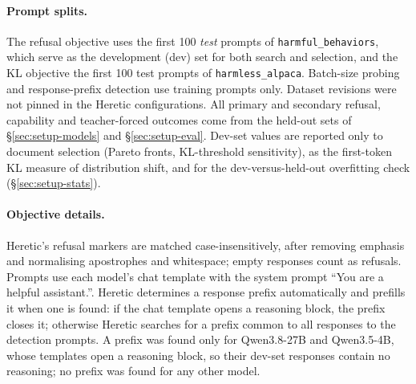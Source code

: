 \paragraph{Prompt splits.} The refusal objective uses the first 100
\emph{test} prompts of \texttt{harmful\_behaviors}, which serve as the
development (dev) set for both search and selection, and the KL objective the
first 100 test prompts of \texttt{harmless\_alpaca}. Batch-size probing and
response-prefix detection use training prompts only. Dataset revisions were
not pinned in the Heretic configurations. All primary and secondary refusal,
capability and teacher-forced outcomes come from the held-out sets of
\S\ref{sec:setup-models} and \S\ref{sec:setup-eval}. Dev-set values are reported only to document selection
(Pareto fronts, KL-threshold sensitivity), as the first-token KL measure of
distribution shift, and for the dev-versus-held-out overfitting check
(\S\ref{sec:setup-stats}).

\paragraph{Objective details.} Heretic's refusal markers are matched
case-insensitively, after removing emphasis and normalising apostrophes and
whitespace; empty responses count as refusals. Prompts use each model's chat
template with the system prompt ``You are a helpful assistant.''. Heretic
determines a response prefix automatically and prefills it when one is found:
if the chat template opens a reasoning block, the prefix closes it; otherwise
Heretic searches for a prefix common to all responses to the detection prompts.
A prefix was found only for Qwen3.8-27B and Qwen3.5-4B, whose templates open a
reasoning block, so their dev-set responses contain no reasoning; no prefix was
found for any other model.

